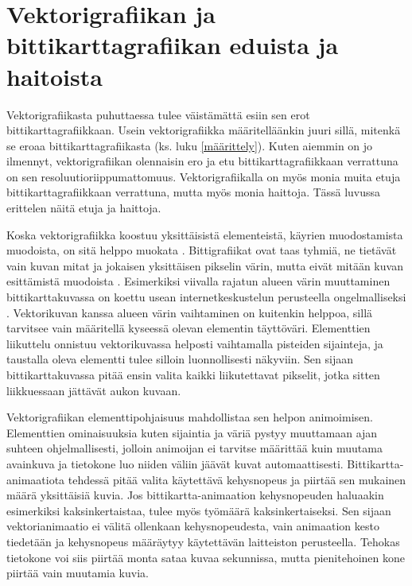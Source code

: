 \documentclass[utf8,bachelor]{gradu3}
\begin{document}
\section{Vektorigrafiikan ja bittikarttagrafiikan eduista ja haitoista}


Vektorigrafiikasta puhuttaessa tulee väistämättä esiin sen erot bittikarttagrafiikkaan. Usein vektorigrafiikka määritelläänkin juuri sillä, mitenkä se eroaa bittikarttagrafiikasta (ks. luku \ref{määrittely}). Kuten aiemmin on jo ilmennyt, vektorigrafiikan olennaisin ero ja etu bittikarttagrafiikkaan verrattuna on sen resoluutioriippumattomuus. Vektorigrafiikalla on myös monia muita etuja bittikarttagrafiikkaan verrattuna, mutta myös monia haittoja. Tässä luvussa erittelen näitä etuja ja haittoja.

Koska vektorigrafiikka koostuu yksittäisistä elementeistä, käyrien muodostamista muodoista, on sitä helppo muokata \parencite{RefWorks:doc:5bdc5224e4b05afcfde5b159}. Bittigrafiikat ovat taas tyhmiä, ne tietävät vain kuvan mitat ja jokaisen yksittäisen pikselin värin, mutta eivät mitään kuvan esittämistä muodoista \parencite{RefWorks:doc:5bdc5292e4b05afcfde5b171}. Esimerkiksi viivalla rajatun alueen värin muuttaminen bittikarttakuvassa on koettu usean internetkeskustelun perusteella ongelmalliseksi \parencites{RefWorks:doc:5bdf1069e4b0a1f99c63c515}{RefWorks:doc:5bdf10ece4b0273295d72f8a}{RefWorks:doc:5bdf119fe4b0b329c55e47c9}. Vektorikuvan kanssa alueen värin vaihtaminen on kuitenkin helppoa, sillä tarvitsee vain määritellä kyseessä olevan elementin täyttöväri. Elementtien liikuttelu onnistuu vektorikuvassa helposti vaihtamalla pisteiden sijainteja, ja taustalla oleva elementti tulee silloin luonnollisesti näkyviin. Sen sijaan bittikarttakuvassa pitää ensin valita kaikki liikutettavat pikselit, jotka sitten liikkuessaan jättävät aukon kuvaan. \parencite{RefWorks:doc:5bdc5224e4b05afcfde5b159}

Vektorigrafiikan elementtipohjaisuus mahdollistaa sen helpon animoimisen. Elementtien ominaisuuksia kuten sijaintia ja väriä pystyy muuttamaan ajan suhteen ohjelmallisesti, jolloin animoijan ei tarvitse määrittää kuin muutama avainkuva ja tietokone luo niiden väliin jäävät kuvat automaattisesti. Bittikartta-animaatiota tehdessä pitää valita käytettävä kehysnopeus ja piirtää sen mukainen määrä yksittäisiä kuvia. \parencite{RefWorks:doc:5bdc5224e4b05afcfde5b159} Jos bittikartta-animaation kehysnopeuden haluaakin esimerkiksi kaksinkertaistaa, tulee myös työmäärä kaksinkertaiseksi. Sen sijaan vektorianimaatio ei välitä ollenkaan kehysnopeudesta, vain animaation kesto tiedetään ja kehysnopeus määräytyy käytettävän laitteiston perusteella. Tehokas tietokone voi siis piirtää monta sataa kuvaa sekunnissa, mutta pienitehoinen kone piirtää vain muutamia kuvia.
\end{document}
